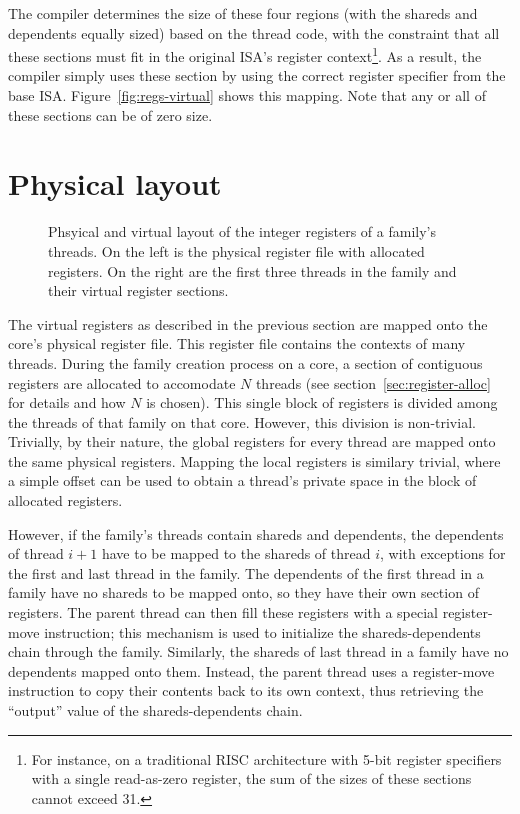 The compiler determines the size of these four regions (with the shareds and dependents equally sized) based on the thread code, with the constraint that all these sections must fit in the original ISA's register context\footnote{For instance, on a traditional RISC architecture with 5-bit register specifiers with a single read-as-zero register, the sum of the sizes of these sections cannot exceed 31.}. As a result, the compiler simply uses these section by using the correct register specifier from the base ISA. Figure~\ref{fig:regs-virtual} shows this mapping. Note that any or all of these sections can be of zero size. 

\section{Physical layout}

\begin{figure}
 \begin{center}
  
  \caption{Phsyical and virtual layout of the integer registers of a family's threads. On the left is the physical register file with allocated registers. On the right are the first three threads in the family and their virtual register sections.}
  \label{fig:regs-physical}
 \end{center}
\end{figure}

The virtual registers as described in the previous section are mapped onto the core's physical register file. This register file contains the contexts of many threads. During the family creation process on a core, a section of contiguous registers are allocated to accomodate $N$ threads (see section~\ref{sec:register-alloc} for details and how $N$ is chosen). This single block of registers is divided among the threads of that family on that core. However, this division is non-trivial. Trivially, by their nature, the global registers for every thread are mapped onto the same physical registers. Mapping the local registers is similary trivial, where a simple offset can be used to obtain a thread's private space in the block of allocated registers.

However, if the family's threads contain shareds and dependents, the dependents of thread $i+1$ have to be mapped to the shareds of thread $i$, with exceptions for the first and last thread in the family. The dependents of the first thread in a family have no shareds to be mapped onto, so they have their own section of registers. The parent thread can then fill these registers with a special register-move instruction; this mechanism is used to initialize the shareds-dependents chain through the family. Similarly, the shareds of last thread in a family have no dependents mapped onto them. Instead, the parent thread uses a register-move instruction to copy their contents back to its own context, thus retrieving the ``output'' value of the shareds-dependents chain.

